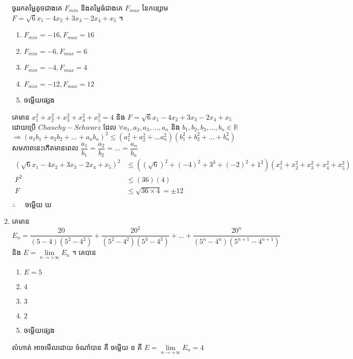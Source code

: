 \documentclass[a4paper,12pt]{article}
\begin{document}
\begin{enumerate}[m]
	ចូររកតម្លៃតូចជាងគេ $F_{min}$ និងតម្លៃធំជាងគេ $F_{max}$ នៃកន្សោម $F=\sqrt{6}x_1-4x_2+3x_3-2x_4+x_5$ ។
	\begin{enumerate}[k,3]
		\item $F_{min}=-16,F_{max}=16$
		\item $F_{min}=-6,F_{max}=6$
		\item $F_{min}=-4,F_{max}=4$
		\item $F_{min}=-12,F_{max}=12$
		\item ចម្លើយផ្សេង
	\end{enumerate}
	\answer
	\begin{center}
		គេមាន $x_1^2+x_2^2+x_3^2+x_4^2+x_5^2=4$ និង $F=\sqrt{6}x_1-4x_2+3x_3-2x_4+x_5$ \\
		ដោយប្រើ $Chauchy-Schwarz$ ដែល $\forall a_1,a_2, a_3,\dots,a_n$ និង $b_1, b_2, b_3,\dots,b_n \in\mathbb{R}$\\
		$\Rightarrow\left(a_1b_1+a_2b_2+\dots+a_nb_n\right)^2\le\left(a_1^2+a_2^2+\dots a_n^2\right)\left(b_1^2+b_2^2+\dots +b_n^2\right)$\\
		សមភាពនេះកើតមានពេល
		$\dfrac{a_1}{b_1}=\dfrac{a_2}{b_2}=\dots=\dfrac{a_n}{b_n}$
			\begin{align*}
				\left(\sqrt{6}x_1-4x_2+3x_3-2x_4+x_5\right)^2&\le\left(\left(\sqrt{6}\right)^2+\left(-4\right)^2+3^3+\left(-2\right)^2+1^2\right)\left(x_1^2+x_2^2+x_3^2+x_4^2+x_5^2\right)\\
				F^2&\le\left(36\right)\left(4\right)\\
				F&\le\sqrt{36\times4}=\pm12\\
			\end{align*}
		$\therefore \quad$ \kml ចម្លើយ \kbk ឃ
	\end{center}
	{\color{blue}\hrulefill}
	\item គេមាន $E_n=\dfrac{20}{\left(5-4\right)\left(5^2-4^2\right)}+\dfrac{20^2}{\left(5^2-4^2\right)\left(5^3-4^3\right)}+\dots+\dfrac{20^n}{\left(5^n-4^n\right)\left(5^{n+1}-4^{n+1}\right)}$ និង $E=\lim\limits_{n\to+\infty}E_n$ ។ គេបាន\\
	\begin{enumerate}[k,5]
		\item $E=5$
		\item $4$
		\item $3$
		\item $2$
		\item ចម្លើយផ្សេង
	\end{enumerate}
	\answer
	\begin{center}
		លំហាត់ អាចមើលដោយ ចំណាំបាន គឺ \kml ចម្លើយ \kbk ខ គឺ $E=\lim\limits_{n\to+\infty}E_n=4$\\
		

\end{center}
\end{enumerate}
\end{document}
